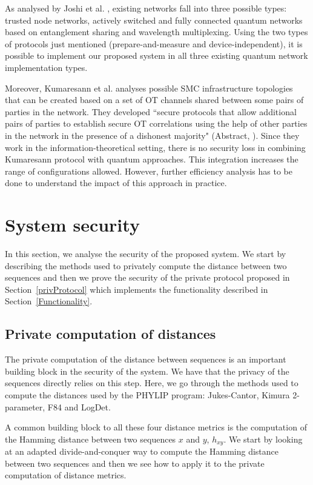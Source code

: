 As analysed by Joshi et al. \cite{JAW20}, existing networks fall into three possible types: trusted node networks, actively switched and fully connected quantum networks based on entanglement sharing and wavelength multiplexing. Using the two types of protocols just mentioned (prepare-and-measure and device-independent), it is possible to implement our proposed system in all three existing quantum network implementation types.

Moreover, Kumaresann et al. \cite{KRS16} analyses possible SMC infrastructure topologies that can be created based on a set of OT channels shared between some pairs of parties in the network. They developed ``secure protocols that allow additional pairs of parties to establish secure OT correlations using the help of other parties in the network in the presence of a dishonest majority" (Abstract, \cite{KRS16}). Since they work in the information-theoretical setting, there is no security loss in combining Kumaresann protocol with quantum approaches. This integration increases the range of configurations allowed. However, further efficiency analysis has to be done to understand the impact of this approach in practice.



\section{System security}\label{systemSecurity}

In this section, we analyse the security of the proposed system. We start by describing the methods used to privately compute the distance between two sequences and then we prove the security of the private protocol proposed in Section~\ref{privProtocol} which implements the functionality described in Section~\ref{Functionality}.


\subsection{Private computation of distances} \label{privDistances}

The private computation of the distance between sequences is an important building block in the security of the system. We have that the privacy of the sequences directly relies on this step. Here, we go through the methods used to compute the distances used by the PHYLIP program: Jukes-Cantor, Kimura 2-parameter, F84 and LogDet.

A common building block to all these four distance metrics is the computation of the Hamming distance between two sequences $x$ and $y$, $h_{xy}$. We start by looking at an adapted divide-and-conquer way to compute the Hamming distance between two sequences and then we see how to apply it to the private computation of distance metrics.

